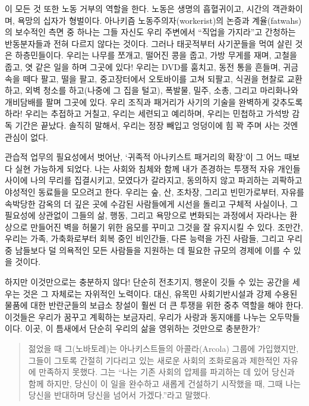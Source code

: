 \documentclass[10pt, b6paper, openany]{memoir}
\begin{document}
\begin{article}
이 모든 것 또한 노동 거부의 역할을 한다. 노동은 생명의 흡혈귀이고, 시간의 객관화이며, 욕망의 십자가 형벌이다. 아나키즘 노동주의자(workerist)의 논증과 계율(fatwahs)의 보수적인 측면 중 하나는 그들 자신도 우리 주변에서 ``직업을 가지라''고 간청하는 반동분자들과 전혀 다르지 않다는 것이다. 그러나 태곳적부터 사기꾼들을 먹여 살린 것은 하층민들이다. 우리는 나무를 쪼개고, 떨어진 콩을 줍고, 가방 무게를 재며, 고철을 줍고, 엿 같은 일을 하며 그곳에 있다! 우리는 DVD를 훔치고, 동전 통을 흔들며, 귀금속을 떼다 팔고, 떨을 팔고, 중고장터에서 오토바이를 고쳐 되팔고, 식권을 현찰로 교환하고, 외벽 청소를 하고(나중에 그 집을 털고), 폭발물, 밀주, 소총, 그리고 마리화나와 개비담배를 팔며 그곳에 있다. 우리 조직과 패거리가 사기의 기술을 완벽하게 갖추도록 하라! 우리는 추접하고 거칠고, 우리는 세련되고 예리하며, 우리는 민첩하고 가석방 감독 기간은 끝났다. 솔직히 말해서, 우리는 정장 빼입고 엉덩이에 힘 꽉 주며 사는 것엔 관심이 없다.

관습적 업무의 필요성에서 벗어난, `귀족적 아나키스트 패거리의 확장'이 그 어느 때보다 실현 가능하게 되었다. 나는 사회와 침체와 함께 내가 존경하는 투쟁적 자유 개인들 사이에 나의 무리를 집결시키고, 모였다가 갈라지고, 동의하지 않고 파괴하는 괴팍하고 야성적인 동료들을 모으려고 한다. 우리는 숲, 산, 조차장, 그리고 빈민가로부터, 자유를 속박당한 감옥의 더 깊은 곳에 수감된 사람들에게 시선을 돌리고 구체적 사실이나, 그 필요성에 상관없이 그들의 삶, 행동, 그리고 욕망으로 변화되는 과정에서 자라나는 환상으로 만들어진 벽을 허물기 위한 음모를 꾸미고 그것을 잘 유지시킬 수 있다. 조만간, 우리는 가족, 가축화로부터 회복 중인 비인간들, 다른 능력을 가진 사람들, 그리고 우리 중 남들보다 덜 의욕적인 모든 사람들을 지원하는 데 필요한 규모의 경제에 이를 수 있을 것이다. 

하지만 이것만으로는 충분하지 않다! 단순히 전초기지, 행운이 깃들 수 있는 공간을 세우는 것은 그 자체로는 자위적인 노력이다. 대신, 유목민 사회기반시설과 강제 수용된 물품에 대한 반란군들의 보급소 창설이 훨씬 더 큰 투쟁을 위한 중추 역할을 해야 한다. 이것들은 우리가 꿈꾸고 계획하는 보금자리, 우리가 사랑과 동지애를 나누는 오두막들이다. 이곳, 이 틈새에서 단순히 우리의 삶을 영위하는 것만으로 충분한가? 

\begin{quote}
젊었을 때 그(노바토레)는 아나키스트들의 아콜라(Arcola) 그룹에 가입했지만, 그들이 그토록 간절히 기다리고 있는 새로운 사회의 조화로움과 제한적인 자유에 만족하지 못했다. 그는 ``나는 기존 사회의 압제를 파괴하는 데 있어 당신과 함께 하지만, 당신이 이 일을 완수하고 새롭게 건설하기 시작했을 때, 그때 나는 당신을 반대하며 당신을 넘어서 가겠다.''라고 말했다.\parencite{atc:enzo1950}
\end{quote}


\end{article}
\end{document}
